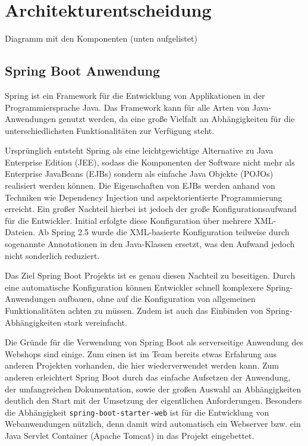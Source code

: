 \section{Architekturentscheidung}\label{arch_decission}
Diagramm mit den Komponenten (unten aufgelistet) %

\subsection{Spring Boot Anwendung}
Spring ist ein Framework für die Entwicklung von Applikationen in der Programmiersprache Java. Das Framework kann für alle Arten von Java-Anwendungen genutzt werden, da eine große Vielfalt an Abhängigkeiten für die unterschiedlichsten Funktionalitäten zur Verfügung steht.

Ursprünglich entsteht Spring als eine leichtgewichtige Alternative zu Java Enterprise Edition (\acs{JEE}), sodass die Komponenten der Software nicht mehr als Enterprise JavaBeans (\acs{EJB}s) sondern als einfache Java Objekte (\acs{POJO}s) realisiert werden können. Die Eigenschaften von \acs{EJB}s werden anhand von Techniken wie Dependency Injection und aspektorientierte Programmierung erreicht. Ein großer Nachteil hierbei ist jedoch der große Konfigurationsaufwand für die Entwickler. Initial erfolgte diese Konfiguration über mehrere \acs{XML}-Dateien. Ab Spring 2.5 wurde die \acs{XML}-basierte Konfiguration teilweise durch sogenannte Annotationen in den Java-Klassen ersetzt, was den Aufwand jedoch nicht sonderlich reduziert\cite{Walls2015}.

Das Ziel Spring Boot Projekts ist es genau diesen Nachteil zu beseitigen. Durch eine automatische Konfiguration können Entwickler schnell komplexere Spring-Anwendungen aufbauen, ohne auf die Konfiguration von allgemeinen Funktionalitäten achten zu müssen. Zudem ist auch das Einbinden von Spring-Abhängigkeiten stark vereinfacht\cite{Webb2013}.

Die Gründe für die Verwendung von Spring Boot als serverseitige Anwendung des Webshops sind einige. Zum einen ist im Team bereits etwas Erfahrung aus anderen Projekten vorhanden, die hier wiederverwendet werden kann. Zum anderen erleichtert Spring Boot durch das einfache Aufsetzen der Anwendung, der umfangreichen Dokumentation, sowie der großen Auswahl an Abhängigkeiten deutlich den Start mit der Umsetzung der eigentlichen Anforderungen. Besonders die Abhängigkeit \texttt{spring-boot-starter-web} ist für die Entwicklung von Webanwendungen nützlich, denn damit wird automatisch ein Webserver bzw. ein Java Servlet Container (Apache Tomcat) in das Projekt eingebettet.

